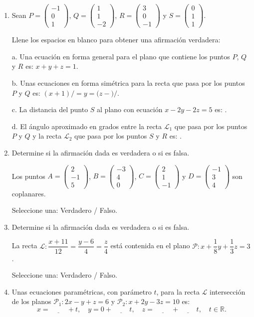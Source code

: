 \documentclass[11pt]{article}
\newcommand{\vectiii}[3]{\begin{pmatrix}#1\\#2\\#3\end{pmatrix}}
\begin{document}
\begin{enumerate}
\item[\textbf{Punto 6.}] Sean $P=\vectiii{-1}{0}{1}$, $Q=\vectiii{1}{1}{-2}$, $R=\vectiii{3}{0}{-1}$ y $S=\vectiii{0}{1}{1}$.

Llene los espacios en blanco para obtener una afirmación verdadera:

a. Una ecuación en forma general para el plano que contiene los puntos $P$, $Q$ y $R$ es: \underline{\hspace{1cm}}$x+$\underline{\hspace{1cm}}$y+$\underline{\hspace{1cm}}$z=1$.

b. Unas ecuaciones en forma simétrica para la recta que pasa por los puntos $P$ y $Q$ es: $(x+1)/$\underline{\hspace{1cm}}$=y=(z-$\underline{\hspace{1cm}}$)/$\underline{\hspace{1cm}}.

c. La distancia del punto $S$ al plano con ecuación $x-2y-2z=5$ es: \underline{\hspace{2cm}}.

d. El ángulo aproximado en grados entre la recta $\mathcal{L}_1$ que pasa por los puntos $P$ y $Q$ y la recta $\mathcal{L}_2$ que pasa por los puntos $S$ y $R$ es: \underline{\hspace{2cm}}.

\item[\textbf{Punto 7.}] Determine si la afirmación dada es verdadera o si es falsa.

Los puntos $A=\vectiii{2}{-1}{5}$, $B=\vectiii{-3}{4}{0}$, $C=\vectiii{2}{1}{-1}$ y $D=\vectiii{-1}{3}{4}$ son coplanares.

Seleccione una: Verdadero / Falso.

\item[\textbf{Punto 8.}] Determine si la afirmación dada es verdadera o si es falsa.

La recta $\mathcal{L}:\dfrac{x+11}{12}=\dfrac{y-6}{4}=\dfrac{z}{4}$ está contenida en el plano $\mathcal{P}: x+\dfrac{1}{8}y+\dfrac{1}{3}z=3$.

Seleccione una: Verdadero / Falso.

\item[\textbf{Punto 9.}] Unas ecuaciones paramétricas, con parámetro $t$, para la recta $\mathcal{L}$ intersección de los planos $\mathcal{P}_1: 2x-y+z=6$ y $\mathcal{P}_2: x+2y-3z=10$ es:
$$x=\underline{\hspace{1cm}}+t,\quad y=0+\underline{\hspace{1cm}}t,\quad z=\underline{\hspace{1cm}}+\underline{\hspace{1cm}}t,\quad t\in\mathbb{R}.$$


\end{enumerate}
\end{document}
